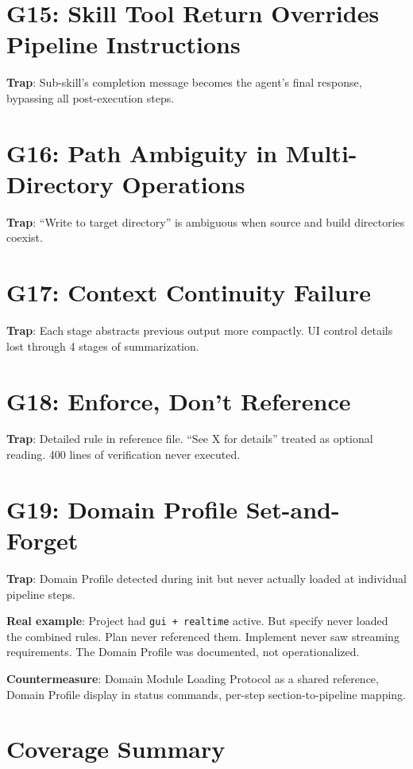 \documentclass[11pt,a4paper,openright,twoside]{report}
\begin{document}
\section{G15: Skill Tool Return Overrides Pipeline Instructions}

\textbf{Trap}: Sub-skill's completion message becomes the agent's final response, bypassing all post-execution steps.

\section{G16: Path Ambiguity in Multi-Directory Operations}

\textbf{Trap}: ``Write to target directory'' is ambiguous when source and build directories coexist.

\section{G17: Context Continuity Failure}

\textbf{Trap}: Each stage abstracts previous output more compactly. UI control details lost through 4 stages of summarization.

\section{G18: Enforce, Don't Reference}

\textbf{Trap}: Detailed rule in reference file. ``See X for details'' treated as optional reading. 400 lines of verification never executed.

\section{G19: Domain Profile Set-and-Forget}

\textbf{Trap}: Domain Profile detected during init but never actually loaded at individual pipeline steps.

\textbf{Real example}: Project had \texttt{gui + realtime} active. But specify never loaded the combined rules. Plan never referenced them. Implement never saw streaming requirements. The Domain Profile was documented, not operationalized.

\textbf{Countermeasure}: Domain Module Loading Protocol as a shared reference, Domain Profile display in status commands, per-step section-to-pipeline mapping.

\section{Coverage Summary}
\end{document}
